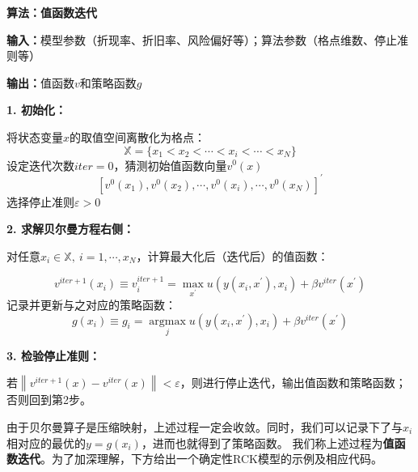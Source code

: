 \begin{mdframed}[linecolor=Black,linewidth=1pt]
    \textbf{算法：值函数迭代}

    \textbf{输入：}模型参数（折现率、折旧率、风险偏好等）；算法参数（格点维数、停止准则等）

    \textbf{输出：}值函数$v$和策略函数$g$

    \textbf{1. 初始化：}

    将状态变量$x$的取值空间离散化为格点：
    \begin{equation*}
        \mathbb{X} = \{x_1<x_2<\cdots<x_i<\cdots<x_N\}
    \end{equation*}
    设定迭代次数$iter=0$，猜测初始值函数向量$v^0(x)$
    \begin{equation*}
        \left[v^0(x_1),v^0(x_2),\cdots,v^0(x_i),\cdots,v^0(x_N)\right]^{\prime}
    \end{equation*}
    选择停止准则$\varepsilon>0$

    \textbf{2. 求解贝尔曼方程右侧：}

    对任意$x_{i}\in\mathbb{X},~ i=1,\cdots,x_N$，计算最大化后（迭代后）的值函数：

    \begin{equation*}
        v^{iter+1}(x_i) \equiv v^{iter+1}_i = \max_{x^{\prime}} u\left(y\left(x_i,x^{\prime}\right),x_i\right)
            + \beta v^{iter}(x^{\prime})
    \end{equation*}
    记录并更新与之对应的策略函数：
    \begin{equation*}
        g(x_i) \equiv g_i = \underset{j}{\operatorname{argmax}}
            u\left(y\left(x_i,x^{\prime}\right),x_i\right) + \beta v^{iter}(x^{\prime})
    \end{equation*}

    \textbf{3. 检验停止准则：}

    若$\left\|v^{iter+1}(x)-v^{iter}(x)\right\|<\varepsilon$，则进行停止迭代，输出值函数和策略函数；
    否则回到第2步。
\end{mdframed}

由于贝尔曼算子是压缩映射，上述过程一定会收敛。同时，我们可以记录下了与$x_i$相对应的最优的$y=g(x_i)$，进而也就得到了策略函数。
我们称上述过程为\textbf{值函数迭代}。为了加深理解，下方给出一个确定性RCK模型的示例及相应代码。

